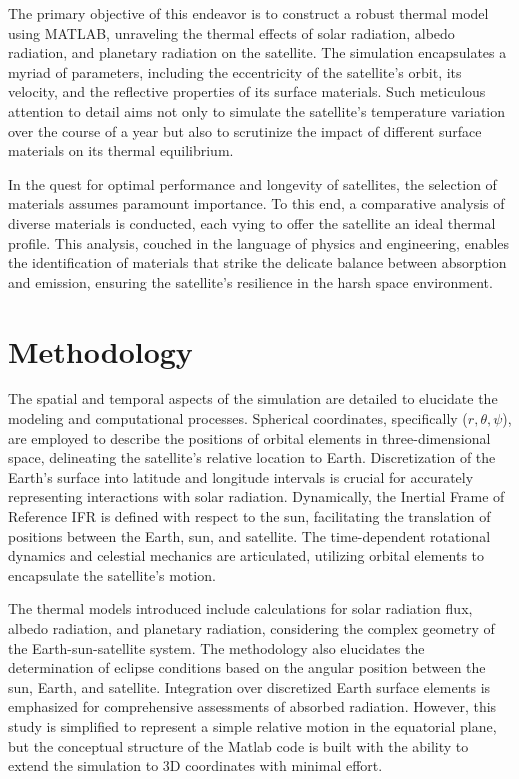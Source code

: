 \documentclass[11pt]{article}
\begin{document}
\indent The primary objective of this endeavor is to construct a robust thermal model using MATLAB, unraveling the thermal effects of solar radiation, albedo radiation, and planetary radiation on the satellite. The simulation encapsulates a myriad of parameters, including the eccentricity of the satellite's orbit, its velocity, and the reflective properties of its surface materials. Such meticulous attention to detail aims not only to simulate the satellite's temperature variation over the course of a year but also to scrutinize the impact of different surface materials on its thermal equilibrium.

\indent In the quest for optimal performance and longevity of satellites, the selection of materials assumes paramount importance. To this end, a comparative analysis of diverse materials is conducted, each vying to offer the satellite an ideal thermal profile. This analysis, couched in the language of physics and engineering, enables the identification of materials that strike the delicate balance between absorption and emission, ensuring the satellite's resilience in the harsh space environment.






\section{Methodology}   
\indent The spatial and temporal aspects of the simulation are detailed to elucidate the modeling and computational processes. Spherical coordinates, specifically ($r,\theta,\psi$), are employed to describe the positions of orbital elements in three-dimensional space, delineating the satellite’s relative location to Earth. Discretization of the Earth’s surface into latitude and longitude intervals is crucial for accurately representing interactions with solar radiation. Dynamically, the Inertial Frame of Reference \ac{IFR} is defined with respect to the sun, facilitating the translation of positions between the Earth, sun, and satellite. The time-dependent rotational dynamics and celestial mechanics are articulated, utilizing orbital elements to encapsulate the satellite’s motion.

\indent The thermal models introduced include calculations for solar radiation flux, albedo radiation, and planetary radiation, considering the complex geometry of the Earth-sun-satellite system. The methodology also elucidates the determination of eclipse conditions based on the angular position between the sun, Earth, and satellite. Integration over discretized Earth surface elements is emphasized for comprehensive assessments of absorbed radiation. However, this study is simplified to represent a simple relative motion in the equatorial plane, but the conceptual structure of the Matlab code is built with the ability to extend the simulation to 3D coordinates with minimal effort.
\end{document}
